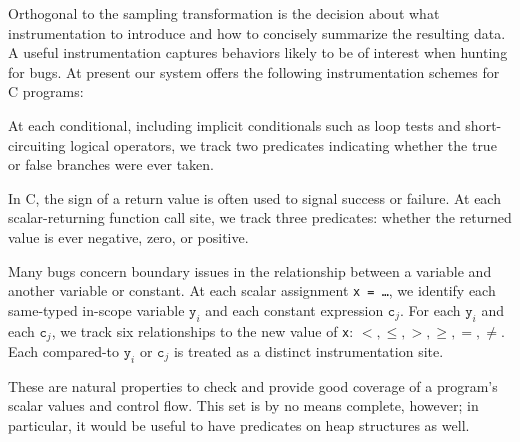 \documentclass[draft]{sig-alternate}
\newcommand{\issue}[2][]{}
\begin{document}
Orthogonal to the sampling transformation is the decision about what
instrumentation to introduce and how to concisely summarize the
resulting data.  A useful instrumentation captures behaviors likely to
be of interest when hunting for bugs.  At present our system offers
the following instrumentation schemes for C programs:

\begin{description}
\sloppy
\item[branches:] At each conditional, including implicit conditionals
such as loop tests and short-circuiting logical operators, we track two predicates
indicating whether the true or false branches were ever taken.

\item[returns:] In C, the
  sign of a return value is often used to signal success or failure.
  At each scalar-returning function call site, we track three predicates:
  whether the returned value is ever negative, zero, or positive.  

\item[scalar-pairs:] Many bugs
  concern boundary issues in the relationship between a 
  variable and another variable or constant.  At
  each scalar assignment \texttt{x = \dots}, we identify each
  same-typed in-scope variable $\mathtt{y}_i$ and each
  constant expression $\mathtt{c}_j$.  For each   $\mathtt{y}_i$ and each $\mathtt{c}_j$,  
  we track six relationships to the new value of \texttt{x}: $<, \leq, >, \geq, =, \neq$.
Each compared-to $\mathtt{y}_i$
  or $\mathtt{c}_j$ is treated as a distinct instrumentation site.
  \issue[Alice]{Changed to "we identify" to match the next sentence.}
\end{description}

These are natural properties to check and provide good
coverage of a program's scalar values and control flow.  This set 
is by no means complete, however; in particular, it would be useful
to have predicates on heap structures as well.
\end{document}
